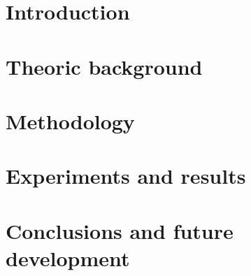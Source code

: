 \documentclass[a4paper,12pt,titlepage]{article}
\begin{document}
\newpage
{}

\section{Introduction}\label{sec:introduction}


\section{Theoric background}\label{sec:theoric-background}



\section{Methodology}\label{sec:methodology}


\section{Experiments and results}\label{sec:experiments-and-results}


\section{Conclusions and future development}\label{sec:conclusions-and-future-development}


\printbibliography
\end{document}
